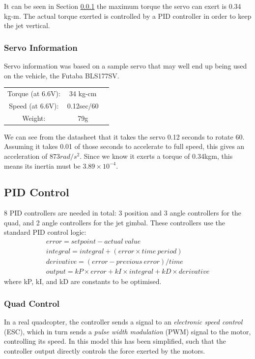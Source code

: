 \documentclass[11pt]{article}
\begin{document}
It can be seen in Section \ref{servo_info} the maximum torque the servo can exert is 0.34 kg-m. The actual torque exerted is controlled by a PID controller in order to keep the jet vertical.

\subsubsection{Servo Information}  \label{servo_info}
Servo information was based on a sample servo that may well end up being used on the vehicle, the Futaba BLS177SV.

\begin{center}
\begin{tabular}{ccc}
    Torque (at 6.6V): & 34 kg-cm \\
    Speed (at 6.6V): & 0.12sec/60\textdegree{} \\
    Weight: & 79g \\
\end{tabular}
\end{center}

We can see from the datasheet that it takes the servo 0.12 seconds to rotate 60\textdegree{}. Assuming it takes 0.01 of those seconds to accelerate to full speed, this gives an acceleration of $873rad/s^2$. Since we know it exerts a torque of 0.34kgm, this means its inertia must be $3.89\times10^{-4}$.

\subsection{PID Control} \label{sec:PID_Control}
8 PID controllers are needed in total: 3 position and 3 angle controllers for the quad, and 2 angle controllers for the jet gimbal. These controllers use the standard PID control logic:
\begin{eqnarray*}
    error = setpoint - actual\ value \\
    integral = integral + (error \times time\ period) \\
    derivative = (error - previous\ error)/time \\
    output = kP \times error + kI \times integral + kD \times derivative
\end{eqnarray*}
where kP, kI, and kD are constants to be optimised.

\subsubsection{Quad Control}
In a real quadcopter, the controller sends a signal to an \emph{electronic speed control} (ESC), which in turn sends a \emph{pulse width modulation} (PWM) signal to the motor, controlling its speed. In this model this has been simplified, such that the controller output directly controls the force exerted by the motors.
\end{document}
